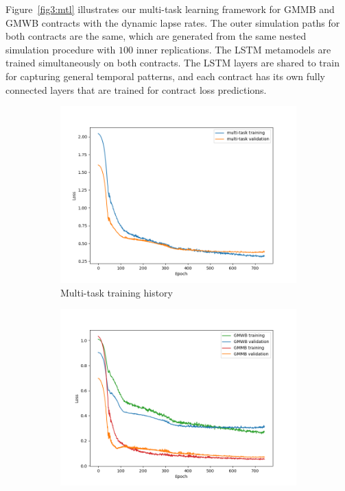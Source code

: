 Figure~\ref{fig3:mtl} illustrates our multi-task learning framework for GMMB and GMWB contracts with the dynamic lapse rates.
The outer simulation paths for both contracts are the same, which are generated from the same nested simulation procedure with $100$ inner replications.
The LSTM metamodels are trained simultaneously on both contracts.
The LSTM layers are shared to train for capturing general temporal patterns, and each contract has its own fully connected layers that are trained for contract loss predictions.


\begin{figure}[ht!]
    \centering
    \begin{subfigure}{0.48\textwidth}
        \includegraphics[width=\textwidth]{./project3/figures/figure5a.png}
        \caption{Multi-task training history} 
        \label{subfig3-5:multiTask}
    \end{subfigure}\hfill
    \begin{subfigure}{0.48\textwidth}
        \includegraphics[width=\textwidth]{./project3/figures/figure5b.png}

\end{subfigure}
\end{figure}
